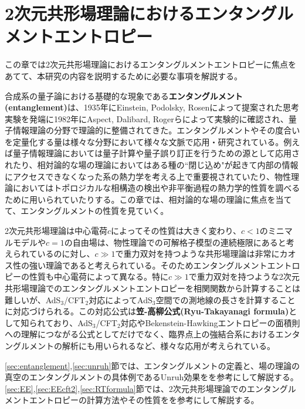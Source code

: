 \chapter{2次元共形場理論におけるエンタングルメントエントロピー}\label{chap:EEreview}
この章では2次元共形場理論におけるエンタングルメントエントロピーに焦点をあてて、本研究の内容を説明するために必要な事項を解説する。
\newline

合成系の量子論における基礎的な現象である\textbf{エンタングルメント(entanglement)}は、1935年にEinstein, Podolsky, Rosenによって提案された思考実験\cite{EPR1935}を発端に1982年にAspect, Dalibard, Roger\cite{Aspect1982}らによって実験的に確認され、量子情報理論の分野で理論的に整備されてきた。エンタングルメントやその度合いを定量化する量は様々な分野において様々な文脈で応用・研究されている。例えば量子情報理論においては量子計算や量子誤り訂正を行うための源として応用されたり\cite{HayashietalQI}\cite{nielsen_chuang_2010}、相対論的な場の理論においてはある種の``閉じ込め"が起きて内部の情報にアクセスできなくなった系の熱力学を考える上で重要視されていたり、物性理論においてはトポロジカルな相構造の検出\cite{Kitaev2006}\cite{Levin_2006}や非平衡過程の熱力学的性質を調べるため\cite{Sagawa}\cite{Calabrese_2016}に用いられていたりする。この章では、相対論的な場の理論に焦点を当てて、エンタングルメントの性質を見ていく。

2次元共形場理論は中心電荷$c$によってその性質は大きく変わり、$c<1$のミニマルモデルや$c=1$の自由場は、物性理論での可解格子模型の連続極限にあると考えられているのに対し、$c\gg 1$で重力双対を持つような共形場理論は非常にカオス性の強い理論であると考えられている\cite{Maldacena:2015waa}。そのためエンタングルメントエントロピーの性質も中心電荷によって異なる。特に$c\gg 1$で重力双対を持つような2次元共形場理論でのエンタングルメントエントロピーを相関関数から計算することは難しいが、AdS$_3$/CFT$_2$対応によってAdS$_3$空間での測地線の長さを計算することに対応づけられる。この対応公式は\textbf{笠-高柳公式(Ryu-Takayanagi formula)}\cite{Ryu:2006ef}として知られており、AdS$_3$/CFT$_2$対応やBekenstein-Hawkingエントロピーの面積則への理解につながる公式としてだけでなく、臨界点上の強結合系におけるエンタングルメントの解析にも用いられるなど、様々な応用が考えられている。
\newline

\ref{sec:entanglement},\ref{sec:unruh}節では、エンタングルメントの定義と、場の理論の真空のエンタングルメントの具体例であるUnruh効果を\cite{Ohya}\cite{TakayanagiJapan}\cite{Hotta}\cite{Iso}\cite{Birrell:1982ix}\cite{Crispino:2007eb}\cite{Nishioka:2018khk}を参考にして解説する。\ref{sec:EE},\ref{sec:EEcft2},\ref{sec:RTformula}節では、2次元共形場理論でのエンタングルメントエントロピーの計算方法やその性質を\cite{TakayanagiJapan}\cite{Nishioka:2018khk}\cite{Rangamani:2016dms}\cite{Takayanagi:2012kg}\cite{wu2019ads3}\cite{Calabrese:2004eu}\cite{Calabrese:2009qy}を参考にして解説する。

